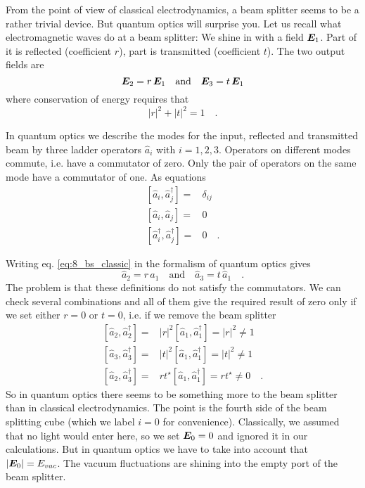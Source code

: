 From the point of view of classical electrodynamics, a beam splitter seems to be a rather trivial device. But quantum optics will surprise you. Let us recall what electromagnetic waves do at a beam splitter: We shine in with a field $\boldsymbol{E}_1$. Part of it is reflected (coefficient $r$), part is transmitted (coefficient $t$). The two output fields are
\begin{equation}
    \boldsymbol{E}_2 = r \, \boldsymbol{E}_1 \quad \text{and} \quad  \boldsymbol{E}_3 = t \, \boldsymbol{E}_1 \label{eq:8_bs_classic}
\end{equation}
where conservation of energy requires that 
\begin{equation}
    |r|^2 + |t|^2 = 1 \quad .
\end{equation}


In quantum optics we describe the modes for the input, reflected and transmitted beam by three ladder operators $\hat{a}_i$ with $i = 1,2,3$. Operators on different modes commute, i.e. have a commutator of zero. Only the pair of operators on the same mode have a commutator of one. As equations
\begin{align}
    \left[ \hat{a}_i, \hat{a}_j^\dagger  \right] = &  \delta_{ij} \\
    \left[ \hat{a}_i, \hat{a}_j  \right] = &  0 \\
    \left[ \hat{a}^\dagger_i, \hat{a}^\dagger_j  \right] = &  0  \quad .
\end{align}

Writing eq. \ref{eq:8_bs_classic} in the formalism of quantum optics gives
\begin{equation}
    \hat{a}_2 = r \, \hat{a}_1 \quad \text{and} \quad  \hat{a}_3 = t \, \hat{a}_1  \quad . \label{eq:8_bs_QO1}
\end{equation}
The problem is that these definitions do not satisfy the commutators. We can check several combinations and all of them give the required result of zero only if we set either $r=0$ or $t=0$, i.e. if we remove the beam splitter
\begin{align}
    \left[ \hat{a}_2, \hat{a}_2^\dagger  \right] = &  |r|^2 \left[ \hat{a}_1, \hat{a}_1^\dagger  \right] =  |r|^2  \neq 1 \\
    \left[ \hat{a}_3, \hat{a}_3^\dagger  \right] = &  |t|^2 \left[ \hat{a}_1, \hat{a}_1^\dagger  \right] =  |t|^2  \neq 1 \\
    \left[ \hat{a}_2, \hat{a}_3^\dagger  \right] = &  rt^\star \left[ \hat{a}_1, \hat{a}_1^\dagger  \right] =   rt^\star  \neq 0  \quad .
\end{align}
So in quantum optics there seems to be something more to the beam splitter than in classical electrodynamics. The point is the fourth side of the beam splitting cube (which we label $i=0$ for convenience). Classically, we assumed that no light would enter here, so we set $\boldsymbol{E}_0 = 0$ and ignored it in our calculations. But in quantum optics we have to take into account that $|\boldsymbol{E}_0| = E_{vac}$. The vacuum fluctuations are shining into the empty port of the beam splitter.

